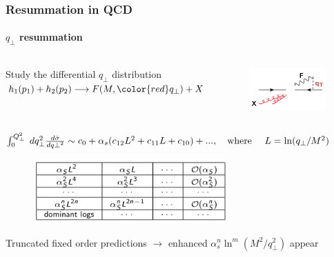 \documentclass[aspectratio=43]{beamer}
\begin{document}
\begin{frame}

	\frametitle{Resummation in QCD}
	\framesubtitle{$q_{\perp}$ resummation}
	
	\begin{columns}
	
		
		\center	Study the differential $q_{\perp}$ distribution \\
		\center	$h_{1}(p_{1}) + h_{2}(p_{2}) \longrightarrow F(M, {\color{red}q_{\perp}}) + X$
	
		
		\begin{figure}
			\includegraphics[width = 4cm]{plots/qT_diagram.png}
		\end{figure}

	\end{columns}

	$\int_{0}^{Q_{\perp}^{2}} \; dq_{\perp}^{2} \frac{d\hat{\sigma}}{dq{\perp}^{2}} \sim c_{0} + \alpha_{s}(c_{12}L^{2} + c_{11}L + c_{10}) + ..., \textrm{\quad where \quad} L = \ln (q_{\perp} / M^{2})$

	\begin{figure}
		\includegraphics[width = 7.5cm]{plots/qT_logs_table.png}
	\end{figure}

	Truncated fixed order predictions $\rightarrow$ {\color{red}enhanced $\alpha_{s}^{n}\ln^{m}(M^{2}/q_{\perp}^{2})$ appear}

\end{frame}
\end{document}
